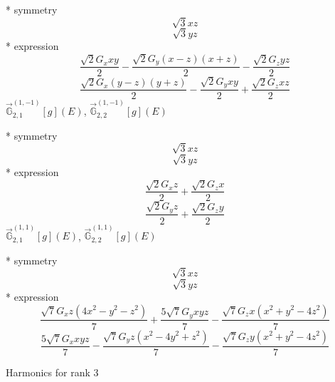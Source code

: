 \documentclass[fleqn,8pt]{jsarticle}
\begin{document}
\noindent\quad ** symmetry
\begin{dmath*}
\sqrt{3} x z
\end{dmath*}
\begin{dmath*}
\sqrt{3} y z
\end{dmath*}
\noindent\quad ** expression
\begin{dmath*}
\frac{\sqrt{2} G_{x} x y}{2} - \frac{\sqrt{2} G_{y} \left(x - z\right) \left(x + z\right)}{2} - \frac{\sqrt{2} G_{z} y z}{2}
\end{dmath*}
\begin{dmath*}
\frac{\sqrt{2} G_{x} \left(y - z\right) \left(y + z\right)}{2} - \frac{\sqrt{2} G_{y} x y}{2} + \frac{\sqrt{2} G_{z} x z}{2}
\end{dmath*}
\noindent\quad $\vec{\mathbb{G}}_{2,1}^{(1,-1)}[g](E)$, $\vec{\mathbb{G}}_{2,2}^{(1,-1)}[g](E)$

\noindent\quad ** symmetry
\begin{dmath*}
\sqrt{3} x z
\end{dmath*}
\begin{dmath*}
\sqrt{3} y z
\end{dmath*}
\noindent\quad ** expression
\begin{dmath*}
\frac{\sqrt{2} G_{x} z}{2} + \frac{\sqrt{2} G_{z} x}{2}
\end{dmath*}
\begin{dmath*}
\frac{\sqrt{2} G_{y} z}{2} + \frac{\sqrt{2} G_{z} y}{2}
\end{dmath*}
\noindent\quad $\vec{\mathbb{G}}_{2,1}^{(1,1)}[g](E)$, $\vec{\mathbb{G}}_{2,2}^{(1,1)}[g](E)$

\noindent\quad ** symmetry
\begin{dmath*}
\sqrt{3} x z
\end{dmath*}
\begin{dmath*}
\sqrt{3} y z
\end{dmath*}
\noindent\quad ** expression
\begin{dmath*}
\frac{\sqrt{7} G_{x} z \left(4 x^{2} - y^{2} - z^{2}\right)}{7} + \frac{5 \sqrt{7} G_{y} x y z}{7} - \frac{\sqrt{7} G_{z} x \left(x^{2} + y^{2} - 4 z^{2}\right)}{7}
\end{dmath*}
\begin{dmath*}
\frac{5 \sqrt{7} G_{x} x y z}{7} - \frac{\sqrt{7} G_{y} z \left(x^{2} - 4 y^{2} + z^{2}\right)}{7} - \frac{\sqrt{7} G_{z} y \left(x^{2} + y^{2} - 4 z^{2}\right)}{7}
\end{dmath*}

\noindent * Harmonics for rank 3
\end{document}
